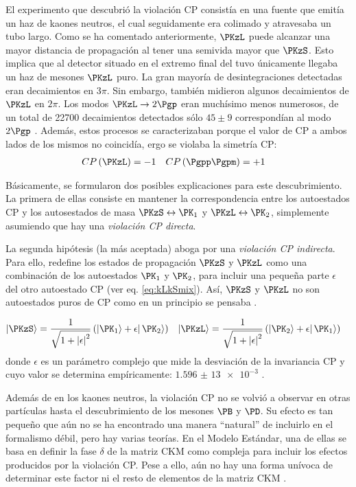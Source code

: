 El experimento que descubrió la violación CP consistía en una fuente que emitía un haz de kaones neutros, el cual seguidamente era colimado y atravesaba un tubo largo. Como se ha comentado anteriormente, $\PKzL$ puede alcanzar una mayor distancia de propagación al tener una semivida mayor que $\PKzS$. Esto implica que al detector situado en el extremo final del tuvo únicamente llegaba un haz de mesones $\PKzL$ puro. La gran mayoría de desintegraciones detectadas eran decaimientos en $3\pi$. Sin embargo, también midieron algunos decaimientos de $\PKzL$ en $2\pi$. Los modos $\PKzL \rightarrow 2\Pgp$ eran muchísimo menos numerosos, de un total de 22700 decaimientos detectados sólo $45 \pm 9$ correspondían al modo $2\Pgp$ \cite{Cronin}. Además, estos procesos se caracterizaban porque el valor de CP a ambos lados de los mismos no coincidía, ergo se violaba la simetría CP:
\begin{align}
CP\left(\PKzL\right) &=-1 & CP\left(\Pgpp\Pgpm\right) &= +1
\end{align}

Básicamente, se formularon dos posibles explicaciones para este descubrimiento.
La primera de ellas consiste en mantener la correspondencia entre los autoestados CP y los autosestados de masa $\PKzS \leftrightarrow \PK_{1}$ y $\PKzL \leftrightarrow \PK_{2}$, simplemente asumiendo que hay una \textit{violación CP directa}.

La segunda hipótesis (la más aceptada) aboga por una \textit{violación CP indirecta}. Para ello, redefine los estados de propagación $\PKzS$ y $\PKzL$ como una combinación de los autoestados $\PK_{1}$ y $\PK_{2}$, para incluir una pequeña parte $\epsilon$ del otro autoestado CP (ver eq. \ref{eq:kLkSmix}). Así, $\PKzS$ y $\PKzL$ no son autoestados puros de CP como en un principio se pensaba \cite{Helsinki}.

\begin{align}
|\PKzS\rangle &= \dfrac{1}{\sqrt{1+\left| \epsilon\right| ^{2}}}\left( \left| \PK_{1}\rangle +\epsilon \right| \PK_{2}\rangle \right) &
|\PKzL\rangle &= \dfrac{1}{\sqrt{1+\left| \epsilon\right| ^{2}}}\left( \left| \PK_{2}\rangle +\epsilon \right| \PK_{1}\rangle \right)\label{eq:kLkSmix}
\end{align}
donde $\epsilon$ es un parámetro complejo que mide la desviación de la invariancia CP y cuyo valor se determina empíricamente: $\num{1,596(13)e-3}$ \cite{Zyla}.

Además de en los kaones neutros, la violación CP no se volvió a observar en otras partículas hasta el descubrimiento de los mesones $\PB$ y $\PD$. Su efecto es tan pequeño que aún no se ha encontrado una manera ``natural'' de incluirlo en el formalismo débil, pero hay varias teorías. En el Modelo Estándar, una de ellas se basa en definir la fase $\delta$ de la matriz CKM como compleja para incluir los efectos producidos por la violación CP. Pese a ello, aún no hay una forma unívoca de determinar este factor ni el resto de elementos de la matriz CKM \cite{Griffiths2008}.

